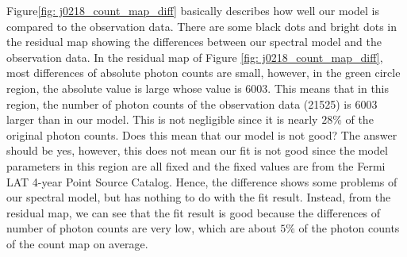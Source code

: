 \documentclass[12pt]{report}
\begin{document}
            Figure\ref{fig: j0218_count_map_diff} basically describes how well our model is compared to the 
            observation data. There are some black dots and bright dots in the residual map showing 
            the differences between our spectral model and the observation data. In the residual map of Figure
            \ref{fig: j0218_count_map_diff}, most differences of absolute photon counts are small, however,
            in the green circle region, the absolute value is large whose value is 6003. This means that in this region,
            the number of photon counts of the observation data (21525) is 6003 larger than in our model.  
            This is not negligible since it is nearly $28\%$ of the original photon counts. 
            Does this mean that our model is not good? The answer should be yes, however, this does 
            not mean our fit is not good since the model parameters in this region are all fixed and the 
            fixed values are from the Fermi LAT 4-year Point Source Catalog. Hence, the difference 
            shows some problems of our spectral model, but has nothing to do with the fit result. 
            Instead, from the residual map, we can see that the fit result is good because the differences
            of number of photon counts are very low, which are about $5\%$ of the photon 
            counts of the count map on average.
\end{document}
